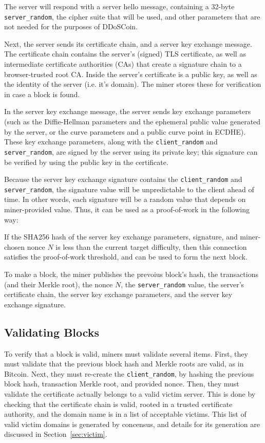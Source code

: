 The server will respond with a server hello message, containing a 32-byte
\texttt{server\_random}, the cipher suite that will be used, and other
parameters that are not needed for the purposes of DDoSCoin.

Next, the server sends its certificate chain, and a server key exchange message.
The certificate chain contains the server's (signed) TLS certificate, as well as
intermediate certificate authorities (CAs) that create a signature chain to a
browser-trusted root CA. Inside the server's certificate is a public
key, as well as the identity of the server (i.e. it's domain). The miner stores
these for verification in case a block is found.

In the server key exchange message, the server sends key exchange parameters
(such as the Diffie-Hellman parameters and the ephemeral public value generated
by the server, or the curve parameters and a public curve point in ECDHE). These
key exchange parameters, along with the \texttt{client\_random} and
\texttt{server\_random},  are signed by the server using its private key; this
signature can be verified by using the public key in the certificate.

Because the server key exchange signature contains the \texttt{client\_random}
and \texttt{server\_random}, the signature value will be unpredictable to the
client ahead of time. In other words, each signature will be a random value that
depends on miner-provided value. Thus, it can be used as a proof-of-work in the
following way:

If the SHA256 hash of the server key exchange parameters, signature, and
miner-chosen nonce $N$ is less than the current target difficulty, then this
connection satisfies the proof-of-work threshold, and can be used to form the
next block.

To make a block, the miner publishes the prevoius block's hash, the transactions
(and their Merkle root), the nonce $N$, the \texttt{server\_random} value, the
server's certificate chain, the server key exchange parameters, and the server
key exchange signature.

\subsection{Validating Blocks}

To verify that a block is valid, miners must validate several items. First, they
must validate that the previous block hash and Merkle roots are valid, as in
Bitcoin. Next, they must re-create the \texttt{client\_random}, by hashing the
previous block hash, transaction Merkle root, and provided nonce. Then, they
must validate the certificate actually belongs to a valid victim server. This is
done by checking that the certificate chain is valid, rooted in a trusted
certificate authority, and the domain name is in a list of acceptable victims.
This list of valid victim domains is generated by concensus, and details for its
generation are discussed in Section~\ref{sec:victim}.

